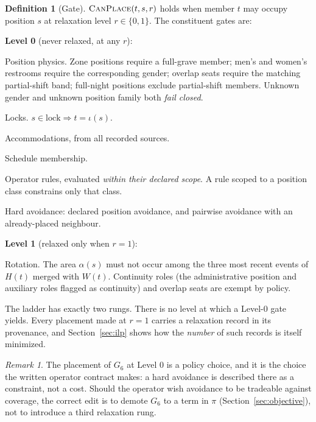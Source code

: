 \documentclass[11pt,a4paper]{article}
\theoremstyle{definition}
\newtheorem{definition}{Definition}
\theoremstyle{remark}
\newtheorem{remark}{Remark}
\newcommand{\canplace}{\textsc{CanPlace}}
\begin{document}
\begin{definition}[Gate]
$\canplace(t, s, r)$ holds when member $t$ may occupy position $s$ at
relaxation level $r \in \{0, 1\}$. The constituent gates are:

\smallskip
\noindent\textbf{Level 0} (never relaxed, at any $r$):
\begin{description}[itemsep=0.1em,topsep=0.2em,leftmargin=3.2em,font=\normalfont\itshape]
  \item[$G_1$] Position physics. Zone positions require a full-grave member;
        men's and women's restrooms require the corresponding gender;
        overlap seats require the matching partial-shift band; full-night
        positions exclude partial-shift members. Unknown gender and unknown
        position family both \emph{fail closed}.
  \item[$G_2$] Locks. $s \in \mathrm{lock} \Rightarrow t = \iota(s)$.
  \item[$G_3$] Accommodations, from all recorded sources.
  \item[$G_4$] Schedule membership.
  \item[$G_5$] Operator rules, evaluated \emph{within their declared scope}.
        A rule scoped to a position class constrains only that class.
  \item[$G_6$] Hard avoidance: declared position avoidance, and pairwise
        avoidance with an already-placed neighbour.
\end{description}

\smallskip
\noindent\textbf{Level 1} (relaxed only when $r = 1$):
\begin{description}[itemsep=0.1em,topsep=0.2em,leftmargin=3.2em,font=\normalfont\itshape]
  \item[$G_7$] Rotation. The area $\alpha(s)$ must not occur among the three
        most recent events of $H(t)$ merged with $W(t)$. Continuity roles
        (the administrative position and auxiliary roles flagged as
        continuity) and overlap seats are exempt by policy.
\end{description}
\end{definition}

The ladder has exactly two rungs. There is no level at which a Level-0 gate
yields. Every placement made at $r = 1$ carries a relaxation record in its
provenance, and Section~\ref{sec:ilp} shows how the \emph{number} of such
records is itself minimized.

\begin{remark}
The placement of $G_6$ at Level 0 is a policy choice, and it is the choice
the written operator contract makes: a hard avoidance is described there as a
constraint, not a cost. Should the operator wish avoidance to be tradeable
against coverage, the correct edit is to demote $G_6$ to a term in $\pi$
(Section~\ref{sec:objective}), not to introduce a third relaxation rung.
\end{remark}
\end{document}

